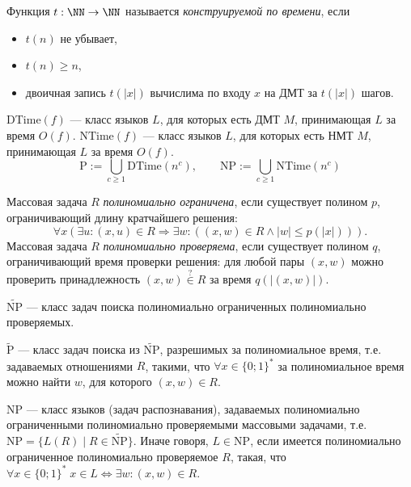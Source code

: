 \documentclass[12pt,a4paper]{article}
\newcommand{\DTime}{\mathrm{DTime}}
\newcommand{\NTime}{\mathrm{NTime}}
\newcommand{\Pclass}{\mathrm{P}}
\newcommand{\NPclass}{\mathrm{NP}}
\begin{document}
    \begin{definition}
        Функция $t: \NN \to \NN$ называется \emph{конструируемой по времени}, если
        \begin{itemize}
            \item $t(n)$ не убывает,
            \item $t(n) \geqslant n$,
            \item двоичная запись $t(|x|)$ вычислима по входу $x$ на ДМТ за $t(|x|)$ шагов.
        \end{itemize}

        $\DTime(f)$ --- класс языков $L$, для которых есть ДМТ $M$, принимающая $L$ за время $O(f)$. $\NTime(f)$ --- класс языков $L$, для которых есть НМТ $M$, принимающая $L$ за время $O(f)$.
        \[\Pclass := \bigcup_{c \geqslant 1} \DTime(n^c), \qquad \NPclass := \bigcup_{c \geqslant 1} \NTime(n^c)\]
    \end{definition}

    \begin{definition}
        Массовая задача $R$ \emph{полиномиально ограничена}, если существует полином $p$, ограничивающий длину кратчайшего решения:
        \[\forall x (\exists u \colon (x, u) \in R \Rightarrow \exists w \colon ((x, w) \in R \wedge |w| \leqslant p(|x|))).\]
        Массовая задача $R$ \emph{полиномиально проверяема}, если существует полином $q$, ограничивающий время проверки решения: для любой пары $(x, w)$ можно проверить принадлежность $(x,w) \overset{?}{\in} R$ за время $q(|(x, w)|)$.

        $\widetilde{\NPclass}$ --- класс задач поиска полиномиально ограниченных полиномиально проверяемых.
        
        $\widetilde{\Pclass}$ --- класс задач поиска из $\widetilde{\NPclass}$, разрешимых за полиномиальное время, т.е. задаваемых отношениями $R$, такими, что $\forall x \in \{0; 1\}^*$ за полиномиальное время можно найти $w$, для которого $(x, w) \in R$.
    \end{definition}

    \begin{definition}[альтернативное]
        $\NPclass$ --- класс языков (задач распознавания), задаваемых полиномиально ограниченными полиномиально проверяемыми массовыми задачами, т.е. $\NPclass = \{L(R) \mid R \in \widetilde{\NPclass}\}$. Иначе говоря, $L \in \NPclass$, если имеется полиномиально ограниченное полиномиально проверяемое $R$, такая, что $\forall x \in \{0; 1\}^* \; x \in L \Longleftrightarrow \exists w\colon (x, w) \in R$.
    \end{definition}
\end{document}
